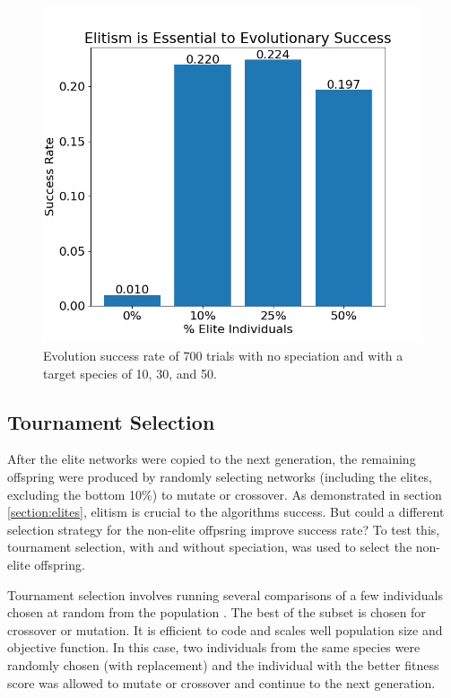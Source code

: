 \documentclass[12pt]{report}
\begin{document}
\begin{figure}
	\centering
    \includegraphics[width=15cm]{images/elitism_success.png}
    \caption[Evolutionary success rate with different levels of elitist selection]{Evolution success rate of 700 trials with no speciation and with a target species of 10, 30, and 50.}
    \label{fig:elitism_success}
\end{figure}


\subsection{Tournament Selection}
After the elite networks were copied to the next generation, the remaining offspring were produced by randomly selecting networks (including the elites, excluding the bottom 10\%) to mutate or crossover. As demonstrated in section \ref{section:elites}, elitism is crucial to the algorithms success. But could a different selection strategy for the non-elite offpsring improve success rate? To test this, tournament selection, with and without speciation, was used to select the non-elite offspring.

Tournament selection involves running several comparisons of a few individuals chosen at random from the population \cite{tournamentselect,  Miller1995}. The best of the subset is chosen for crossover or mutation. It is efficient to code and scales well population size and objective function. In this case, two individuals from the same species were randomly chosen (with replacement) and the individual with the better fitness score was allowed to mutate or crossover and continue to the next generation.
\end{document}
